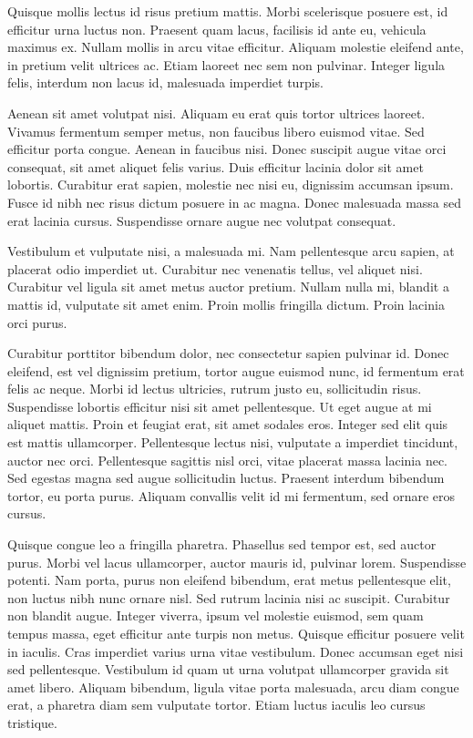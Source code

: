 \documentclass[a4paper]{article}
\begin{document}
Quisque mollis lectus id risus pretium mattis. Morbi scelerisque posuere est, id efficitur urna luctus non. Praesent quam lacus, facilisis id ante eu, vehicula maximus ex. Nullam mollis in arcu vitae efficitur. Aliquam molestie eleifend ante, in pretium velit ultrices ac. Etiam laoreet nec sem non pulvinar. Integer ligula felis, interdum non lacus id, malesuada imperdiet turpis.

Aenean sit amet volutpat nisi. Aliquam eu erat quis tortor ultrices laoreet. Vivamus fermentum semper metus, non faucibus libero euismod vitae. Sed efficitur porta congue. Aenean in faucibus nisi. Donec suscipit augue vitae orci consequat, sit amet aliquet felis varius. Duis efficitur lacinia dolor sit amet lobortis. Curabitur erat sapien, molestie nec nisi eu, dignissim accumsan ipsum. Fusce id nibh nec risus dictum posuere in ac magna. Donec malesuada massa sed erat lacinia cursus. Suspendisse ornare augue nec volutpat consequat.

Vestibulum et vulputate nisi, a malesuada mi. Nam pellentesque arcu sapien, at placerat odio imperdiet ut. Curabitur nec venenatis tellus, vel aliquet nisi. Curabitur vel ligula sit amet metus auctor pretium. Nullam nulla mi, blandit a mattis id, vulputate sit amet enim. Proin mollis fringilla dictum. Proin lacinia orci purus.

Curabitur porttitor bibendum dolor, nec consectetur sapien pulvinar id. Donec eleifend, est vel dignissim pretium, tortor augue euismod nunc, id fermentum erat felis ac neque. Morbi id lectus ultricies, rutrum justo eu, sollicitudin risus. Suspendisse lobortis efficitur nisi sit amet pellentesque. Ut eget augue at mi aliquet mattis. Proin et feugiat erat, sit amet sodales eros. Integer sed elit quis est mattis ullamcorper. Pellentesque lectus nisi, vulputate a imperdiet tincidunt, auctor nec orci. Pellentesque sagittis nisl orci, vitae placerat massa lacinia nec. Sed egestas magna sed augue sollicitudin luctus. Praesent interdum bibendum tortor, eu porta purus. Aliquam convallis velit id mi fermentum, sed ornare eros cursus.

Quisque congue leo a fringilla pharetra. Phasellus sed tempor est, sed auctor purus. Morbi vel lacus ullamcorper, auctor mauris id, pulvinar lorem. Suspendisse potenti. Nam porta, purus non eleifend bibendum, erat metus pellentesque elit, non luctus nibh nunc ornare nisl. Sed rutrum lacinia nisi ac suscipit. Curabitur non blandit augue. Integer viverra, ipsum vel molestie euismod, sem quam tempus massa, eget efficitur ante turpis non metus. Quisque efficitur posuere velit in iaculis. Cras imperdiet varius urna vitae vestibulum. Donec accumsan eget nisi sed pellentesque. Vestibulum id quam ut urna volutpat ullamcorper gravida sit amet libero. Aliquam bibendum, ligula vitae porta malesuada, arcu diam congue erat, a pharetra diam sem vulputate tortor. Etiam luctus iaculis leo cursus tristique.
\end{document}
